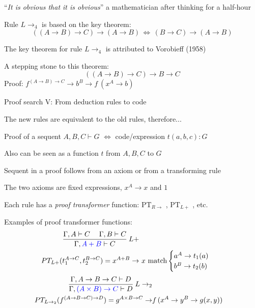 ``\emph{It is obvious that it is obvious}'' \textemdash{} a mathematician
after thinking for a half-hour

Rule $L\rightarrow_{4}$ is based on the key theorem: {\footnotesize{}
\[
\left(\left(A\rightarrow B\right)\rightarrow C\right)\rightarrow\left(A\rightarrow B\right)\,\Longleftrightarrow\,\left(B\rightarrow C\right)\rightarrow\left(A\rightarrow B\right)
\]
}{\footnotesize\par}

The key theorem for rule $L\rightarrow_{4}$ is attributed to Vorobieff
(1958)

A stepping stone to this theorem:{\footnotesize{}
\[
\left(\left(A\rightarrow B\right)\rightarrow C\right)\rightarrow B\rightarrow C
\]
}Proof: $f^{\left(A\rightarrow B\right)\rightarrow C}\rightarrow b^{B}\rightarrow f\:(x^{A}\rightarrow b)$

Proof search V: From deduction rules to code

The new rules are equivalent to the old rules, therefore...

Proof of a sequent $A,B,C\vdash G$ $\Leftrightarrow$ code/expression
$t(a,b,c):G$

Also can be seen as a function $t$ from $A,B,C$ to $G$

Sequent in a proof follows from an axiom or from a transforming rule

The two axioms are fixed expressions, $x^{A}\rightarrow x$ and $1$

Each rule has a \emph{proof transformer} function: $\text{PT}_{R\rightarrow}$
, $\text{PT}_{L+}$ , etc.

Examples of proof transformer functions:
\begin{align*}
\frac{\Gamma,A\vdash C\quad\;\Gamma,B\vdash C}{\Gamma,{\color{blue}A+B}\vdash C}\:L+\\
PT_{L+}(t_{1}^{A\rightarrow C},t_{2}^{B\rightarrow C})=x^{A+B}\rightarrow & \ x\ \text{match}\begin{cases}
a^{A}\rightarrow t_{1}(a)\\
b^{B}\rightarrow t_{2}(b)
\end{cases}
\end{align*}
\begin{align*}
\frac{\Gamma,A\rightarrow B\rightarrow C\vdash D}{\Gamma,{\color{blue}(A\times B)\rightarrow C}\vdash D}\:L\rightarrow_{2}\\
PT_{L\rightarrow_{2}}(f^{\left(A\rightarrow B\rightarrow C\right)\rightarrow D})=g^{A\times B\rightarrow C}\rightarrow & f\,(x^{A}\rightarrow y^{B}\rightarrow g(x,y))
\end{align*}

